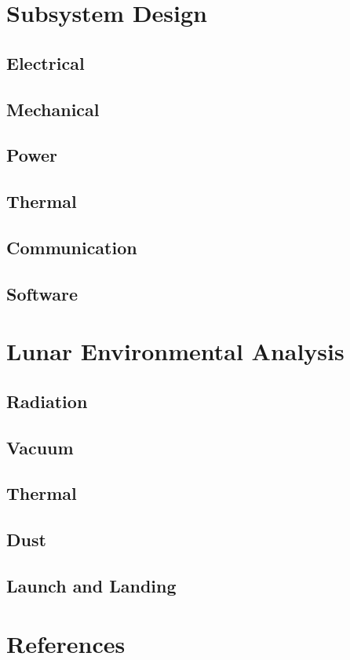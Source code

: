 \documentclass[12pt]{article}
\begin{document}
\chapter{Subsystem Design}
\section{Electrical}
\section{Mechanical}
\section{Power}
\section{Thermal}
\section{Communication}
\section{Software}

\chapter{Lunar Environmental Analysis}
\section{Radiation}
\section{Vacuum}
\section{Thermal}
\section{Dust}
\section{Launch and Landing}


\chapter{References}
\end{document}
